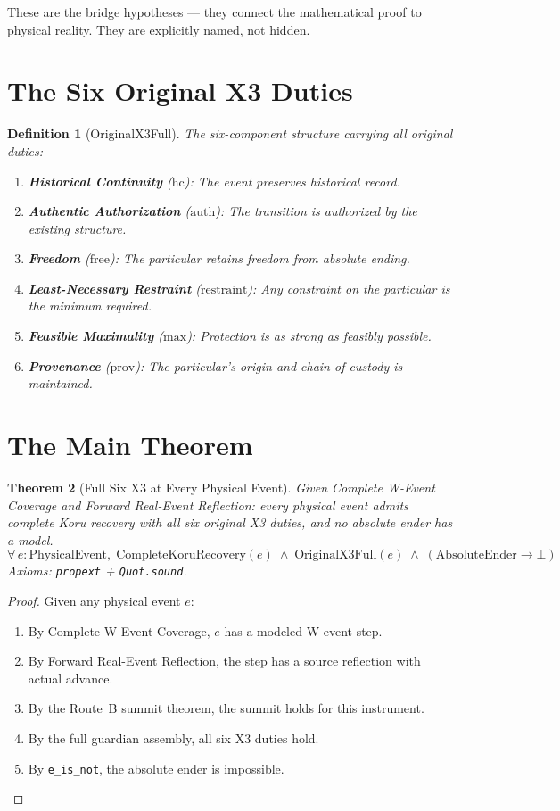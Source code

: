 \documentclass[12pt,a4paper]{article}
\newtheorem{theorem}{Theorem}[section]
\newtheorem{definition}[theorem]{Definition}
\begin{document}
These are the bridge hypotheses --- they connect the mathematical proof
to physical reality. They are explicitly named, not hidden.

\section{The Six Original X3 Duties}

\begin{definition}[OriginalX3Full]
The six-component structure carrying all original duties:
\begin{enumerate}
    \item \textbf{Historical Continuity} ($\text{hc}$): The event preserves
    historical record.
    \item \textbf{Authentic Authorization} ($\text{auth}$): The transition
    is authorized by the existing structure.
    \item \textbf{Freedom} ($\text{free}$): The particular retains freedom
    from absolute ending.
    \item \textbf{Least-Necessary Restraint} ($\text{restraint}$): Any
    constraint on the particular is the minimum required.
    \item \textbf{Feasible Maximality} ($\text{max}$): Protection is as
    strong as feasibly possible.
    \item \textbf{Provenance} ($\text{prov}$): The particular's origin and
    chain of custody is maintained.
\end{enumerate}
\end{definition}

\section{The Main Theorem}

\begin{theorem}[Full Six X3 at Every Physical Event]\label{thm:main}
Given Complete W-Event Coverage and Forward Real-Event Reflection:
every physical event admits complete Koru recovery with all six original
X3 duties, and no absolute ender has a model.
\[
\forall\, e : \text{PhysicalEvent},\;
\text{CompleteKoruRecovery}(e) \;\wedge\;
\text{OriginalX3Full}(e) \;\wedge\;
(\text{AbsoluteEnder} \to \bot)
\]
Axioms: \texttt{propext} + \texttt{Quot.sound}.
\end{theorem}

\begin{proof}
Given any physical event $e$:
\begin{enumerate}
    \item By Complete W-Event Coverage, $e$ has a modeled W-event step.
    \item By Forward Real-Event Reflection, the step has a source
    reflection with actual advance.
    \item By the Route~B summit theorem, the summit holds for this instrument.
    \item By the full guardian assembly, all six X3 duties hold.
    \item By \texttt{e\_is\_not}, the absolute ender is impossible.
\end{enumerate}
\end{proof}
\end{document}

